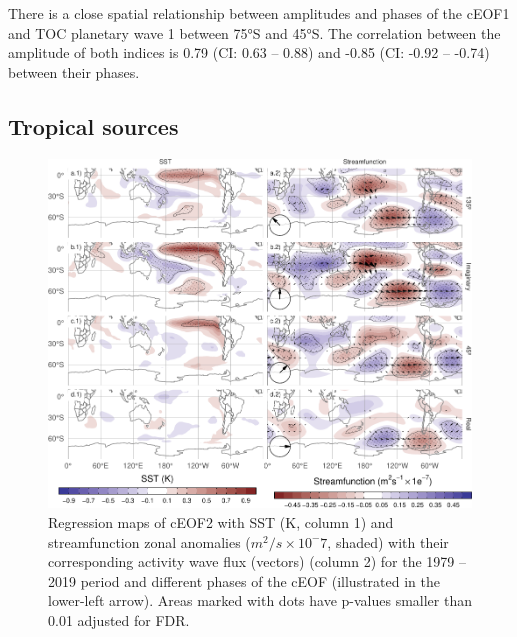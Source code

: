 \documentclass[smallextended]{svjour3}       %
\begin{document}
There is a close spatial relationship between amplitudes and phases of the cEOF1 and TOC planetary wave 1 between 75°S and 45°S.
The correlation between the amplitude of both indices is 0.79 (CI: 0.63 -- 0.88) and -0.85 (CI: -0.92 -- -0.74) between their phases.

\hypertarget{tropical}{%
\subsection{Tropical sources}\label{tropical}}

\begin{figure}
\includegraphics{../figures/sst-psi-2-1} \caption{Regression maps of cEOF2 with SST (K, column 1) and streamfunction zonal anomalies (\(m^2/s\times10^-7\), shaded) with their corresponding activity wave flux (vectors) (column 2) for the 1979 -- 2019 period and different phases of the cEOF (illustrated in the lower-left arrow).
Areas marked with dots have p-values smaller than 0.01 adjusted for FDR.}\label{fig:sst-psi-2}
\end{figure}
\end{document}
